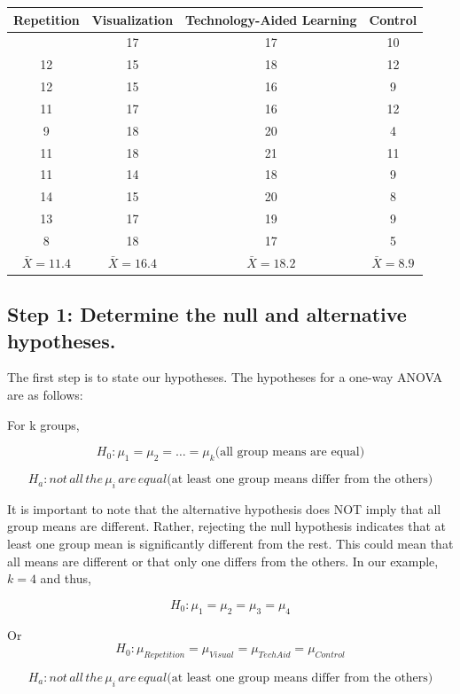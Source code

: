 \documentclass[
  letterpaper,
  DIV=11,
  numbers=noendperiod]{scrreprt}
\begin{document}
\begin{longtable}[]{@{}cccc@{}}
\toprule\noalign{}
Repetition & Visualization & Technology-Aided Learning & Control \\
\midrule\noalign{}
\endhead
\bottomrule\noalign{}
\endlastfoot
13 & 17 & 17 & 10 \\
12 & 15 & 18 & 12 \\
12 & 15 & 16 & 9 \\
11 & 17 & 16 & 12 \\
9 & 18 & 20 & 4 \\
11 & 18 & 21 & 11 \\
11 & 14 & 18 & 9 \\
14 & 15 & 20 & 8 \\
13 & 17 & 19 & 9 \\
8 & 18 & 17 & 5 \\
\(\bar{X}=11.4\) & \(\bar{X}=16.4\) & \(\bar{X}=18.2\) &
\(\bar{X}=8.9\) \\
\end{longtable}

\subsection*{Step 1: Determine the null and alternative
hypotheses.\,}\label{step-1-determine-the-null-and-alternative-hypotheses.-3}

The first step is to state our hypotheses. The hypotheses for a one-way
ANOVA are as follows:\,

For k groups,

\[
H_0: \mu_1=\mu_2= … =\mu_k \text{(all group means are equal)}
\]

\[
H_a : not\,all\,the\,μ_i\,are\,equal \text{(at least one group means differ from the others)}
\]

It is important to note that the alternative hypothesis does NOT imply
that all group means are different. Rather, rejecting the null
hypothesis indicates that at least one group mean is significantly
different from the rest. This could mean that all means are different or
that only one differs from the others. In our example, \(k = 4\) and
thus,

\[
H_0: \mu_1=\mu_2= \mu_3 =\mu_4
\]

Or \[
H_0: \mu_{Repetition} = \mu_{Visual} = \mu_{TechAid} = \mu_{Control}
\]

\[
H_a: not\,all\,the\,μ_i\,are\,equal \text{(at least one group means differ from the others)}
\]
\end{document}
